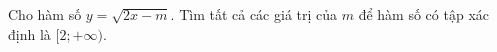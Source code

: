 \begin{ex}
Cho hàm số $y=\sqrt{2x-m}$. Tìm tất cả các giá trị của $m$ để hàm số có tập xác định là $[2;+\infty)$.
\loigiai{Điều kiện: $2x-m\ge0\Leftrightarrow x\ge\tfrac m2$, nên $D=\left[\tfrac m2;+\infty\right)$. Cần $\tfrac m2=2\Leftrightarrow m=4$.}
\end{ex}
